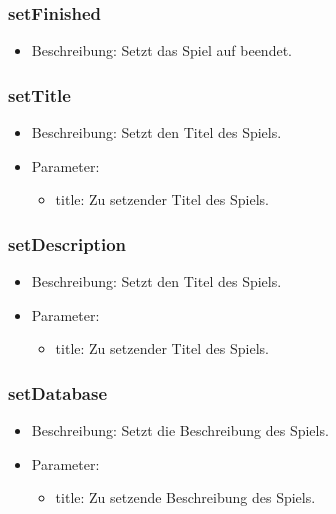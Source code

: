 \documentclass[a4paper]{scrreprt}
\begin{document}
    \subsubsection{setFinished}
    \begin{itemize}
        \item Beschreibung: Setzt das Spiel auf beendet.
    \end{itemize}

    \subsubsection{setTitle}
    \begin{itemize}
        \item Beschreibung: Setzt den Titel des Spiels.
        \item Parameter:
        \begin{itemize}
            \item title: Zu setzender Titel des Spiels.
        \end{itemize}
    \end{itemize}

    \subsubsection{setDescription}
    \begin{itemize}
        \item Beschreibung: Setzt den Titel des Spiels.
        \item Parameter:
        \begin{itemize}
            \item title: Zu setzender Titel des Spiels.
        \end{itemize}
    \end{itemize}

    \subsubsection{setDatabase}
    \begin{itemize}
        \item Beschreibung: Setzt die Beschreibung des Spiels.
        \item Parameter:
        \begin{itemize}
            \item title: Zu setzende Beschreibung des Spiels.
        \end{itemize}
    \end{itemize}
\end{document}
